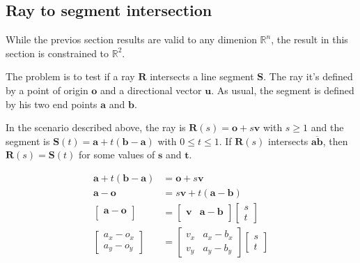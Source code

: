 \subsection{Ray to segment intersection}

While the previos section results are valid to any dimenion $\mathbb{R}^n$, the result in this section is constrained to $\mathbb{R}^2$.

The problem is to test if a ray $\mathbf{R}$ intersects a line segment $\mathbf{S}$.
The ray it's defined by a point of origin $\mathbf{o}$ and a directional vector $\mathbf{u}$.
As usual, the segment is defined by his two end points $\mathbf{a}$ and $\mathbf{b}$.

In the scenario described above, the ray is $\mathbf{R}(s) = \mathbf{o} + s \mathbf{v}$ with $s \geq 1$ and the segment is $\mathbf{S}(t) = \mathbf{a} + t (\mathbf{b} - \mathbf{a})$ with $0 \leq t \leq 1$.
If $\mathbf{R}(s)$ intersects $\overline{\mathbf{a}\mathbf{b}}$, then $\mathbf{R}(s) = \mathbf{S}(t)$ for some values of $\mathbf{s}$ and $\mathbf{t}$.

\begin{align*}
\mathbf{a} + t (\mathbf{b} - \mathbf{a}) &= \mathbf{o} + s \mathbf{v} \\
\mathbf{a} - \mathbf{o} &= s \mathbf{v} + t (\mathbf{a} - \mathbf{b}) \\
\begin{bmatrix}
\mathbf{a} - \mathbf{o}  \\
 ~ 
\end{bmatrix} &= 
\begin{bmatrix}
\mathbf{v} & \mathbf{a} - \mathbf{b} \\
~ & ~
\end{bmatrix}
\begin{bmatrix}
s \\
t 
\end{bmatrix} \\
\begin{bmatrix}
a_x - o_x  \\
a_y - o_y
\end{bmatrix} &= 
\begin{bmatrix}
v_x & a_x - b_x \\
v_y & a_y - b_y
\end{bmatrix}
\begin{bmatrix}
s \\
t 
\end{bmatrix}
\end{align*}

